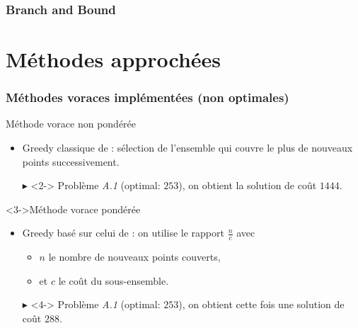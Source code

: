 \documentclass[aspectratio=169,11pt]{beamer}
\begin{document}
	\begin{frame}
		\centering\footnotesize
		
	\end{frame}

	\begin{frame}
		\centering\footnotesize
	\end{frame}

	\begin{frame}
		\frametitle{Branch and Bound}
		\centering%
		\resizebox{0.85\textwidth}{!}{}%
	\end{frame}

	\begin{frame}
		\centering\footnotesize
	\end{frame}

	\begin{frame}
		\centering\footnotesize
	\end{frame}

	\section{Méthodes approchées}

	\begin{frame}
		\frametitle{Méthodes voraces implémentées (non optimales)}
		\begin{block}{Méthode vorace non pondérée}
			\begin{itemize}
				\item Greedy classique de \citeauthor{Johnson:1973:AAC:800125.804034}: sélection de l'ensemble qui couvre le plus de nouveaux points successivement.
				\item[\alert{\(\blacktriangleright\)}]<2-> Problème \emph{A.1} (optimal: \(253\)), on obtient la solution de coût \alert{\(1444\)}.
			\end{itemize}
		\end{block}
		\begin{block}<3->{Méthode vorace pondérée}
			\begin{itemize}
				\item Greedy basé sur celui de \citeauthor{Johnson:1973:AAC:800125.804034}: on utilise le rapport \(\frac{n}{c}\) avec
					\begin{itemize}
						\item \(n\) le nombre de nouveaux points couverts,
						\item et \(c\) le coût du sous-ensemble.
					\end{itemize}
				\item[\alert{\(\blacktriangleright\)}]<4-> Problème \emph{A.1} (optimal: \(253\)), on obtient cette fois une solution de coût \alert{\(288\)}.
			\end{itemize}
		\end{block}
	\end{frame}
\end{document}
